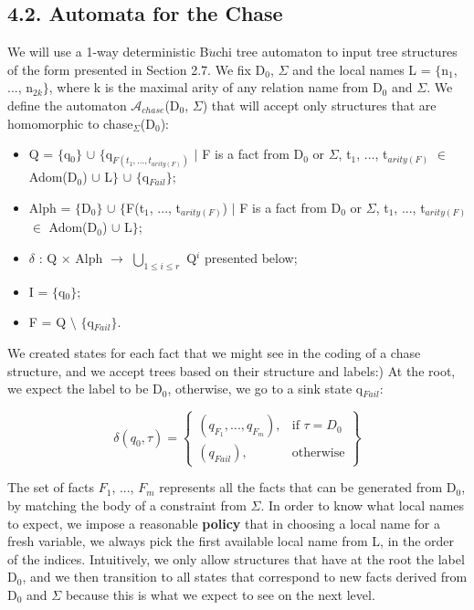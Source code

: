 \documentclass[11pt, a4paper, dvipsnames]{article}
\begin{document}
\subsection{4.2. Automata for the Chase}
We will use a 1-way deterministic B$\ddot{u}$chi tree automaton to input tree structures of the form presented in Section 2.7. We fix D$_{0}$, $\Sigma$ and the local names L = $\{$n$_{1}$, ..., n$_{2k}\}$, where k is the maximal arity of any relation name from D$_{0}$ and $\Sigma$. We define the automaton $\mathcal{A}_{chase}$(D$_{0}$, $\Sigma$) that will accept only structures that are homomorphic to chase$_{\Sigma}$(D$_{0}$):
\begin{itemize}
	\item Q = $\{$q$_{0}\}$ $\cup$ $\{$q$_{F(t_{1}, ..., t_{arity(F)})}$ $|$ F is a fact from D$_{0}$ or $\Sigma$, t$_{1}$, ..., t$_{arity(F)}$ $\in$ Adom(D$_{0}$) $\cup$ L$\}$ $\cup$ $\{$q$_{Fail}\}$;
	\item Alph = $\{$D$_{0}\}$ $\cup$ $\{$F(t$_{1}$, ..., t$_{arity(F)}$) $|$ F is a fact from D$_{0}$ or $\Sigma$, t$_{1}$, ..., t$_{arity(F)}$ $\in$ Adom(D$_{0}$) $\cup$ L$\}$;
	\item $\delta$ : Q $\times$ Alph $\rightarrow$ $\bigcup_{1 \leq i \leq r}$ Q$^{i}$ presented below;
	\item I = $\{$q$_{0}\}$;
	\item F = Q $\setminus$ $\{$q$_{Fail}\}$.
\end{itemize}
We created states for each fact that we might see in the coding of a chase structure, and we accept trees based on their structure and labels:) At the root, we expect the label to be D$_{0}$, otherwise, we go to a sink state q$_{Fail}$:
\begin{center}
\[\delta(q_{0},\tau) = \left\{\begin{array}{lr}
        (q_{F_{1}}, ..., q_{F_{m}}), & \text{if } \tau = D_{0}\\
        (q_{Fail}), & \text{otherwise} 
        \end{array}\right\}
  \] 
\end{center}
The set of facts $F_{1}$, ..., $F_{m}$ represents all the facts that can be generated from D$_{0}$, by matching the body of a constraint from $\Sigma$. In order to know what local names to expect, we impose a reasonable \textbf{policy} that in choosing a local name for a fresh variable, we always pick the first available local name from L, in the order of the indices. Intuitively, we only allow structures that have at the root the label D$_{0}$, and we then transition to all states that correspond to new facts derived from D$_{0}$ and $\Sigma$ because this is what we expect to see on the next level.\newline
\end{document}
